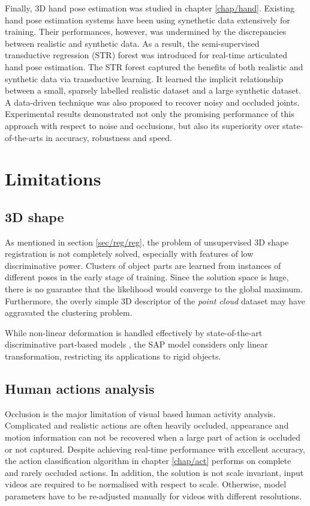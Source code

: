 Finally, 3D hand pose estimation was studied in chapter \ref{chap/hand}. 
Existing hand pose estimation systems have been using synethetic data extensively for training. Their performances, however, was undermined by the discrepancies between realistic and synthetic data. As a result, the semi-supervised transductive regression (STR) forest was introduced for real-time articulated hand pose estimation. 
The STR forest captured the benefits of both realistic and synthetic data via transductive learning. 
It learned the implicit relationship between a small, sparsely labelled realistic dataset and a large synthetic dataset. A data-driven technique was also proposed to recover noisy and occluded joints. 
Experimental results demonstrated not only the promising performance of this approach with respect to noise and occlusions, but also its superiority over state-of-the-arts in accuracy, robustness and speed.

\section{Limitations}

\subsection{3D shape} 

As mentioned in section \ref{sec/reg/reg}, the problem of unsupervised 3D shape registration is not completely solved, especially with features of low discriminative power. Clusters of object parts are learned from instances of different poses in the early stage of training. Since the solution space is huge, there is no guarantee that the likelihood would converge to the global maximum. Furthermore, the overly simple 3D descriptor of the \emph{point cloud} dataset may have aggravated the clustering problem.   

While non-linear deformation is handled effectively by state-of-the-art discriminative part-based models \cite{Felzenszwalb2010, Andriluka2009, Pishchulin2012}, the SAP model considers only linear transformation, restricting its applications to rigid objects. 

\subsection{Human actions analysis} 

Occlusion is the major limitation of visual based human activity analysis. 
Complicated and realistic actions are often heavily occluded, appearance and motion information can not be recovered when a large part of action is occluded or not captured. Despite achieving real-time performance with excellent accuracy, the action classification algorithm in chapter \ref{chap/act} performs on complete and rarely occluded actions. 
In addition, the solution is not scale invariant, input videos are required to be normalised with respect to scale. Otherwise, model parameters have to be re-adjusted manually for videos with different resolutions.  

